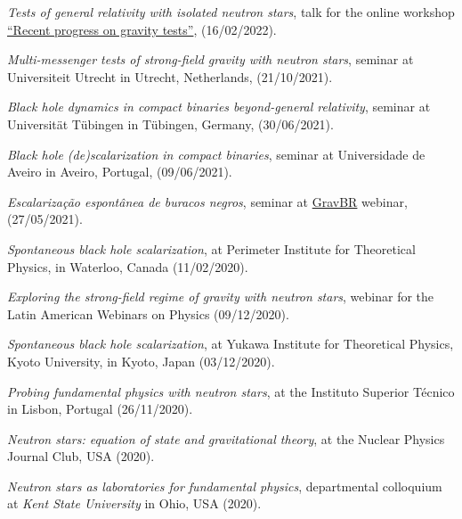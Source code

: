 \documentclass[10pt]{article}
\newcommand{\invited}{{\color{aeilbl}{invited}}}
\begin{document}
\begin{bibenum}
    \item
    \emph{Tests of general relativity with isolated neutron stars},
    \invited{} talk for the online workshop \href{https://honghui-liu.github.io/gravity-test/}{``Recent progress on gravity tests''},
    (16/02/2022).

    \item
    \emph{Multi-messenger tests of strong-field gravity
    with neutron stars},
    \invited{} seminar at Universiteit Utrecht in Utrecht, Netherlands,
    (21/10/2021).

    \item
    \emph{Black hole dynamics in compact binaries beyond-general relativity},
    \invited{} seminar at Universit\"at T\"ubingen in T\"ubingen, Germany,
    (30/06/2021).

    \item
    \emph{Black hole (de)scalarization in compact binaries},
    \invited{} seminar at Universidade de Aveiro in Aveiro, Portugal,
    (09/06/2021).

    \item
    \emph{Escalariza{\c c}{\~a}o espont{\^a}nea de buracos negros},
    \invited{} seminar at \href{https://sites.google.com/view/antoniodpj/gravbr}{GravBR} webinar, (27/05/2021).

    \item
    \emph{Spontaneous black hole scalarization},
    \invited{} at Perimeter Institute for Theoretical Physics,
    in Waterloo, Canada (11/02/2020).

    \item
    \emph{Exploring the strong-field regime of gravity with neutron stars},
    \invited{} webinar for the Latin American Webinars on Physics (09/12/2020).

    \item
    \emph{Spontaneous black hole scalarization},
    \invited{} at Yukawa Institute for Theoretical Physics, Kyoto University,
    in Kyoto, Japan (03/12/2020).

    \item
    \emph{Probing fundamental physics with neutron stars},
    \invited{} at the Instituto Superior T\'ecnico
    in Lisbon, Portugal (26/11/2020).

    \item
    \emph{Neutron stars: equation of state and gravitational theory},
    \invited{} at the Nuclear Physics Journal Club, USA (2020).

    \item
    \emph{Neutron stars as laboratories for fundamental physics},
    \invited{} departmental colloquium at \emph{Kent State University}
    in Ohio, USA (2020).


\end{bibenum}
\end{document}
